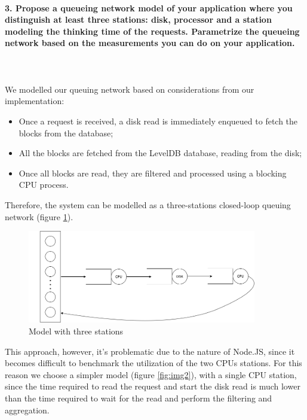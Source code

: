 \documentclass[11pt]{scrartcl} %
\begin{document}
\paragraph*{3. Propose a queueing network model of your application where you distinguish at least three stations: disk, processor and a station modeling the thinking time of the requests. Parametrize the queueing network based on the measurements you can do on your application.} \mbox{}\\\\

We modelled our queuing network based on considerations from our implementation:

\begin{itemize}
\item[\adforn{43}] Once a request is received, a disk read is immediately enqueued to fetch the blocks from the database;
\item[\adforn{43}] All the blocks are fetched from the LevelDB database, reading from the disk;
\item[\adforn{43}] Once all blocks are read, they are filtered and processed using a blocking CPU process.
\end{itemize}

Therefore, the system can be modelled as a three-stations closed-loop queuing network (figure \ref{fig:img1}).

\begin{figure}[h]
\includegraphics[width=10cm]{Images/img1.png}
\centering
\caption{Model with three stations}
\label{fig:img1}
\end{figure}

This approach, however, it's problematic due to the nature of Node.JS, since it becomes difficult to benchmark the utilization of the two CPUs stations. For this reason we choose a simpler model (figure \ref{fig:img2}), with a single CPU station, since the time required to read the request and start the disk read is much lower than the time required to wait for the read and perform the filtering and aggregation.
\end{document}
